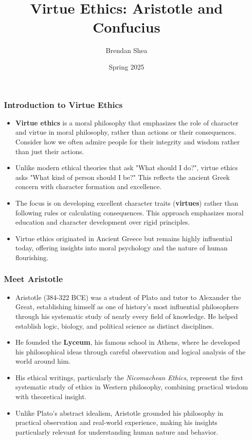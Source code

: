 \documentclass{beamer}
\title{Virtue Ethics: Aristotle and Confucius}
\author{Brendan Shea}
\date{Spring 2025}
\begin{document}
\begin{frame}
    \titlepage
\end{frame}

\begin{frame}
    \frametitle{Introduction to Virtue Ethics}
    \begin{itemize}
        \item \textbf{Virtue ethics} is a moral philosophy that emphasizes the role of character and virtue in moral philosophy, rather than actions or their consequences. Consider how we often admire people for their integrity and wisdom rather than just their actions.
        
        \item Unlike modern ethical theories that ask "What should I do?", virtue ethics asks "What kind of person should I be?" This reflects the ancient Greek concern with character formation and excellence.
        
        \item The focus is on developing excellent character traits (\textbf{virtues}) rather than following rules or calculating consequences. This approach emphasizes moral education and character development over rigid principles.
        
        \item Virtue ethics originated in Ancient Greece but remains highly influential today, offering insights into moral psychology and the nature of human flourishing.
    \end{itemize}
\end{frame}

\begin{frame}
    \frametitle{Meet Aristotle}
    \begin{itemize}
        \item Aristotle (384-322 BCE) was a student of Plato and tutor to Alexander the Great, establishing himself as one of history's most influential philosophers through his systematic study of nearly every field of knowledge. He helped establish logic, biology, and political science as distinct disciplines.
        
        \item He founded the \textbf{Lyceum}, his famous school in Athens, where he developed his philosophical ideas through careful observation and logical analysis of the world around him.
        
        \item His ethical writings, particularly the \textit{Nicomachean Ethics}, represent the first systematic study of ethics in Western philosophy, combining practical wisdom with theoretical insight.
        
        \item Unlike Plato's abstract idealism, Aristotle grounded his philosophy in practical observation and real-world experience, making his insights particularly relevant for understanding human nature and behavior.
    \end{itemize}
\end{frame}
\end{document}

